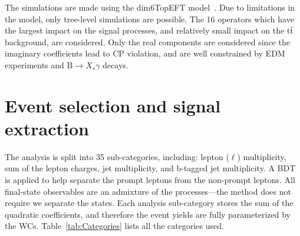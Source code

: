 \documentclass[12pt]{article}
\begin{document}
The simulations are made using the dim6TopEFT model~\cite{AguilarSaavedra:2018nen}. %
Due to limitations in the model, only tree-level simulations are possible. The 16 operators which have the largest impact on the signal processes, and relatively small impact on the $\mathrm{t\overline{t}}$ background, are considered. Only the real components are considered since the imaginary coefficients lead to CP violation, and are well constrained by EDM experiments and $\mathrm{B} \to X_s \gamma$ decays.

\section{Event selection and signal extraction}

The analysis is split into 35 sub-categories, including: lepton ($\ell$) multiplicity, sum of the lepton charges, jet multiplicity, and b-tagged jet multiplicity. A BDT is applied to help separate the prompt leptons from the non-prompt leptons. All final-state observables are an admixture of the processes---the method does not require we separate the states. Each analysis sub-category stores the sum of the quadratic coefficients, and therefore the event yields are fully parameterized by the WCs. Table~\ref{tab:Categories} lists all the categories used.\\
\end{document}

